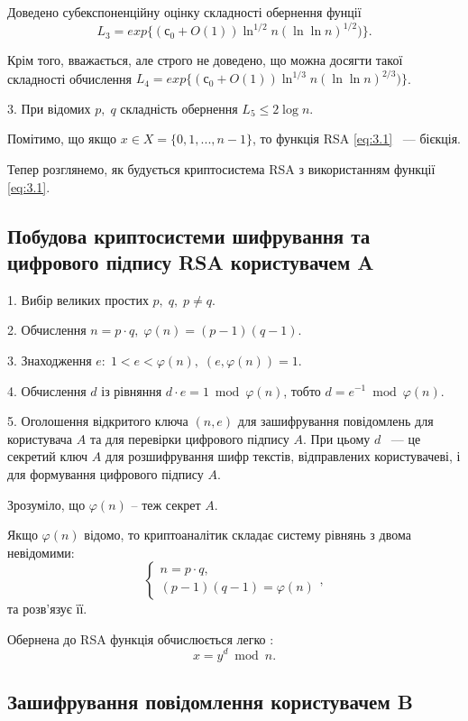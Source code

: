 Доведено субекспоненційну оцінку складності обернення фунції 
\[ L_{3} = exp\{ (  \mbox{с}_{0} + O(1)) \ln ^{1/2} n (\ln\ln n) ^ {1/2}) \}. \]

Крім того, вважається, але строго не доведено, що можна досягти такої складності обчислення $L_{4} = exp\{ (  \mbox{с}_{0} + O(1)) \ln ^{1/3} n (\ln\ln n) ^ {2/3}) \}$.

\par3. При відомих $p,\;q$ складність обернення $L_{5} \leq 2 \log n$.

Помітимо, що якщо $x \in X = \{ 0, 1, ..., n-1 \}$, то функція RSA \eqref{eq:3.1} ~--- бієкція.

Тепер розглянемо, як будується криптосистема RSA з використанням функції \eqref{eq:3.1}.

\subsection{Побудова криптосистеми шифрування та цифрового підпису RSA користувачем A}

\par1. Вибір великих простих $p,\; q,\; p \neq q$.

\par2. Обчислення $n = p \cdot q, \; \varphi(n)=(p-1)(q-1)$.

\par3. Знаходження $e:\;1<e<\varphi(n),\;(e,\varphi(n))=1$.

\par4. Обчислення $d$ із рівняння $d \cdot e = 1 \bmod \varphi(n)$, тобто $d = e ^{-1} \bmod \varphi(n)$.

\par5. Оголошення відкритого ключа $(n,e)$ для зашифрування повідомлень для користувача $A$ та для перевірки цифрового підпису $A$.
При цьому $d$ ~--- це секретий ключ $A$ для розшифрування шифр текстів, відправлених користувачеві, і для формування цифрового підпису $A$.

Зрозуміло, що $\varphi (n)$ -- теж секрет $A$.

Якщо $\varphi (n)$ відомо, то криптоаналітик складає систему рівнянь з двома невідомими:
\begin{equation*}
\begin{cases}
    n = p \cdot q, \\
    (p-1)(q-1) = \varphi (n)
\end{cases},
\end{equation*}
та розв'язує її.

Обернена до RSA функція обчислюється легко : 
\begin{equation} 
x = y ^{d} \bmod n.
\end{equation}

\subsection{Зашифрування повідомлення користувачем B}

